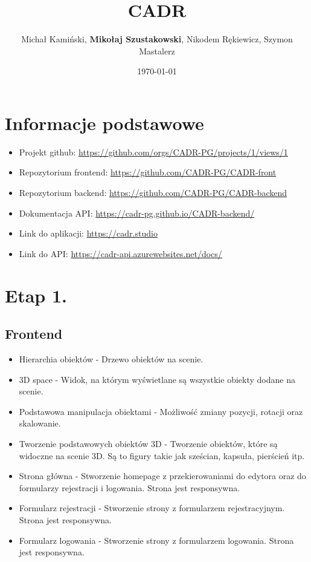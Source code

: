 \documentclass[11pt]{article}
\author{Michał Kamiński, \textbf{Mikołaj Szustakowski}, Nikodem Rękiewicz, Szymon Mastalerz}
\date{\today}
\title{CADR}
\begin{document}
\maketitle
\tableofcontents

\section{Informacje podstawowe}
\label{sec:orgec0de69}
\begin{itemize}
\item Projekt github: \url{https://github.com/orgs/CADR-PG/projects/1/views/1}
\item Repozytorium frontend: \url{https://github.com/CADR-PG/CADR-front}
\item Repozytorium backend: \url{https://github.com/CADR-PG/CADR-backend}
\item Dokumentacja API: \url{https://cadr-pg.github.io/CADR-backend/}
\item Link do aplikacji: \url{https://cadr.studio}
\item Link do API: \url{https://cadr-api.azurewebsites.net/docs/}
\end{itemize}
\section{Etap 1.}
\label{sec:org4b7a57f}
\subsection{Frontend}
\label{sec:org2ed95e8}
\begin{itemize}
\item Hierarchia obiektów - Drzewo obiektów na scenie.
\item 3D space - Widok, na którym wyświetlane są wszystkie obiekty dodane na scenie.
\item Podstawowa manipulacja obiektami - Możliwość zmiany pozycji, rotacji oraz skalowanie.
\item Tworzenie podstawowych obiektów 3D - Tworzenie obiektów, które są widoczne na scenie 3D. Są to figury takie jak sześcian, kapsuła, pierścień itp.
\item Strona główna - Stworzenie homepage z przekierowaniami do edytora oraz do formularzy rejestracji i logowania. Strona jest responsywna.
\item Formularz rejestracji - Stworzenie strony z formularzem rejestracyjnym. Strona jest responsywna.
\item Formularz logowania -  Stworzenie strony z formularzem logowania. Strona jest responsywna.
\end{itemize}
\end{document}
